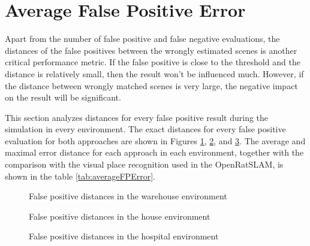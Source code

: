\section{Average False Positive Error}\label{section:averageError}

Apart from the number of false positive and false negative evaluations, the distances of the false positives between the wrongly estimated scenes is another critical performance metric. If the false positive is close to the threshold and the distance is relatively small, then the result won't be influenced much. However, if the distance between wrongly matched scenes is very large, the negative impact on the result will be significant.\par
This section analyzes distances for every false positive result during the simulation in every environment. The exact distances for every false positive evaluation for both approaches are shown in Figures \ref{fig:averageFPErrorWarehouse}, \ref{fig:averageFPErrorHouse}, and \ref{fig:averageFPErrorHospital}. The average and maximal error distance for each approach in each environment, together with the comparison with the visual place recognition used in the OpenRatSLAM, is shown in the table \ref{tab:averageFPError}.\par

\begin{figure}[!tbp]
    \centering
    \hfill
    \caption{False positive distances in the warehouse environment}
    \label{fig:averageFPErrorWarehouse}
\end{figure}

\begin{figure}[!tbp]
    \centering
    \hfill
    \caption{False positive distances in the house environment}
    \label{fig:averageFPErrorHouse}
\end{figure}

\begin{figure}[!tbp]
    \centering
    \hfill
    \caption{False positive distances in the hospital environment}
    \label{fig:averageFPErrorHospital}
\end{figure}

